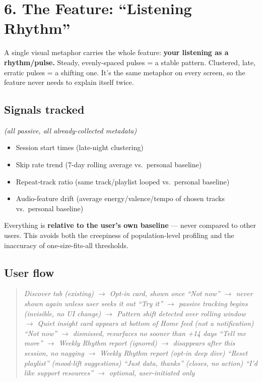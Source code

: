 \documentclass[11pt,a4paper]{article}
\newenvironment{notecard}
  {\begin{quote}\color{softgray}\itshape}
  {\end{quote}}
\begin{document}
\section*{6. The Feature: ``Listening Rhythm''}

A single visual metaphor carries the whole feature: \textbf{your listening as a rhythm/pulse.} Steady, evenly-spaced pulses = a stable pattern. Clustered, late, erratic pulses = a shifting one. It's the same metaphor on every screen, so the feature never needs to explain itself twice.

\subsection*{Signals tracked}
\emph{(all passive, all already-collected metadata)}
\begin{itemize}[leftmargin=1.4em]
  \item Session start times (late-night clustering)
  \item Skip rate trend (7-day rolling average vs.\ personal baseline)
  \item Repeat-track ratio (same track/playlist looped vs.\ personal baseline)
  \item Audio-feature drift (average energy/valence/tempo of chosen tracks vs.\ personal baseline)
\end{itemize}

Everything is \textbf{relative to the user's own baseline} --- never compared to other users. This avoids both the creepiness of population-level profiling and the inaccuracy of one-size-fits-all thresholds.

\subsection*{User flow}
\begin{notecard}
Discover tab (existing)
$\rightarrow$ Opt-in card, shown once
\quad ``Not now'' $\rightarrow$ never shown again unless user seeks it out
\quad ``Try it'' $\rightarrow$ passive tracking begins (invisible, no UI change)
$\rightarrow$ Pattern shift detected over rolling window
$\rightarrow$ Quiet insight card appears at bottom of Home feed (not a notification)
\quad ``Not now'' $\rightarrow$ dismissed, resurfaces no sooner than +14 days
\quad ``Tell me more'' $\rightarrow$ Weekly Rhythm report
\quad (ignored) $\rightarrow$ disappears after this session, no nagging
$\rightarrow$ Weekly Rhythm report (opt-in deep dive)
\quad ``Reset playlist'' (mood-lift suggestions)
\quad ``Just data, thanks'' (closes, no action)
\quad ``I'd like support resources'' $\rightarrow$ optional, user-initiated only
\end{notecard}
\end{document}
